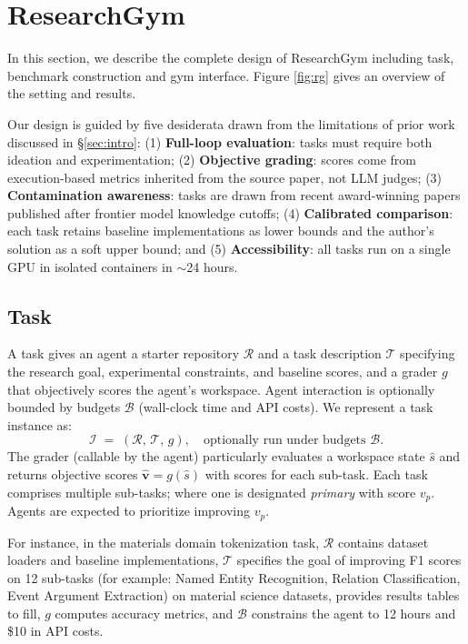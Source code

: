 \documentclass[11pt]{article}
\theoremstyle{plain}
\theoremstyle{definition}
\theoremstyle{remark}
\begin{document}
\section{ResearchGym}

In this section, 
we describe the complete design of ResearchGym including task, benchmark construction and gym interface. Figure \ref{fig:rg} gives an overview of the setting and results.

Our design is guided by five desiderata drawn from the limitations of prior work discussed in \S\ref{sec:intro}: (1) \textbf{Full-loop evaluation}: tasks must
  require both ideation and experimentation; (2) \textbf{Objective grading}: scores come from execution-based metrics inherited from the source paper, not LLM judges; (3) \textbf{Contamination awareness}: tasks are drawn from recent award-winning
  papers published after frontier model knowledge cutoffs; (4) \textbf{Calibrated comparison}: each task retains baseline
  implementations as lower bounds and the author's solution as a soft upper bound; and (5) \textbf{Accessibility}: all tasks run on a single GPU in isolated containers in $\sim$24 hours.

\subsection{Task} \label{rg:task}
A task gives an agent a starter repository $\mathcal{R}$ and a task description $\mathcal{T}$ specifying the research goal, experimental constraints, and baseline scores, and a grader $g$ that objectively scores the agent's workspace. Agent interaction is optionally bounded by budgets $\mathcal{B}$ (wall-clock time and API costs).
We represent a task instance as:
\vspace{-2.5pt}
\begin{equation}
\mathcal{I} \;=\; (\mathcal{R},\, \mathcal{T},\, g),
\quad \text{optionally run under budgets } \mathcal{B}. 
\end{equation}
The grader (callable by the agent) particularly evaluates a workspace state $\hat{s}$ and returns objective scores $\hat{\mathbf{v}}=g(\hat{s})$ 
with scores for each sub-task.
Each task comprises multiple sub-tasks; where one is designated \emph{primary} with score $v_p$. Agents are expected to prioritize improving $v_p$. 

For instance, in the materials domain tokenization task, $\mathcal{R}$ contains dataset loaders and baseline implementations, $\mathcal{T}$ specifies the goal of improving F1 scores on 12 sub-tasks (for example: Named Entity Recognition, Relation Classification, Event Argument Extraction) on material science datasets,
provides results tables to fill, $g$ computes accuracy metrics, and $\mathcal{B}$ constrains the agent to 12 hours and \$10 in API costs. 
\end{document}
